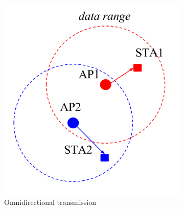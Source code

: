 \documentclass[12pt, a4paper,twoside]{tesi_upf}
\begin{document}
			\begin{figure}[t!]
				\centering
				\begin{subfigure}[b]{0.4\textwidth}
					\includegraphics[width=\textwidth]{images/beamforming1}
					\caption{Omnidirectional transmission}
					\label{fig:beamforming1}
				\end{subfigure}
				\begin{subfigure}[b]{0.31\textwidth}

\end{subfigure}
\end{figure}
\end{document}
